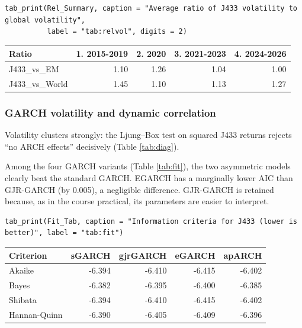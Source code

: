 \documentclass[11pt,preprint]{elsarticle}
\let\origtable\table
\let\endorigtable\endtable
\renewenvironment{table}[1][2] {
    \expandafter\origtable\expandafter[H]
} {
    \endorigtable
}
\numberwithin{equation}{section}
\numberwithin{figure}{section}
\numberwithin{table}{section}
\begin{document}
\begin{verbatim}
tab_print(Rel_Summary, caption = "Average ratio of J433 volatility to global volatility",
          label = "tab:relvol", digits = 2)
\end{verbatim}

\begin{table}[!htbp]
\centering
\caption{Average ratio of J433 volatility to global volatility} 
\label{tab:relvol}
\begingroup\footnotesize
\begin{tabular}{lrrrr}
  \hline
Ratio & 1. 2015-2019 & 2. 2020 & 3. 2021-2023 & 4. 2024-2026 \\ 
  \hline
J433\_vs\_EM & 1.10 & 1.26 & 1.04 & 1.00 \\ 
  J433\_vs\_World & 1.45 & 1.10 & 1.13 & 1.27 \\ 
   \hline
\end{tabular}
\endgroup
\end{table}

\subsubsection{GARCH volatility and dynamic
correlation}\label{garch-volatility-and-dynamic-correlation}

Volatility clusters strongly: the Ljung--Box test on squared J433
returns rejects ``no ARCH effects'' decisively (Table \ref{tab:diag}).

Among the four GARCH variants (Table \ref{tab:fit}), the two asymmetric
models clearly beat the standard GARCH. EGARCH has a marginally lower
AIC than GJR-GARCH (by 0.005), a negligible difference. GJR-GARCH is
retained because, as in the course practical, its parameters are easier
to interpret.

\begin{verbatim}
tab_print(Fit_Tab, caption = "Information criteria for J433 (lower is better)", label = "tab:fit")
\end{verbatim}

\begin{table}[!htbp]
\centering
\caption{Information criteria for J433 (lower is better)} 
\label{tab:fit}
\begingroup\footnotesize
\begin{tabular}{lrrrr}
  \hline
Criterion & sGARCH & gjrGARCH & eGARCH & apARCH \\ 
  \hline
Akaike & -6.394 & -6.410 & -6.415 & -6.402 \\ 
  Bayes & -6.382 & -6.395 & -6.400 & -6.385 \\ 
  Shibata & -6.394 & -6.410 & -6.415 & -6.402 \\ 
  Hannan-Quinn & -6.390 & -6.405 & -6.409 & -6.396 \\ 
   \hline
\end{tabular}
\endgroup
\end{table}
\end{document}
